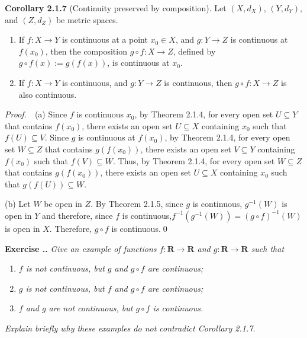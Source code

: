 \documentclass{book}
\newcommand{\pff}{\vspace{.25em}\noindent\emph{Proof.}~~}
\newcommand{\titl}[1]{\noindent\textbf{#1}}
\newcounter{Exercise}[section]
\renewcommand{\theExercise}{\thesection.\arabic{Exercise}.}
\newcommand{\new}{\vspace{1.5em}\noindent\textbf{Exercise \stepcounter{Exercise}\textbf{\theExercise}} }
\begin{document}
\begin{framed}
\titl{Corollary 2.1.7} (Continuity preserved by composition). Let $(X,d_X)$, $(Y,d_Y)$, and $(Z,d_Z)$ be metric spaces.
\begin{enumerate}
    \item If $f:X\to Y$ is continuous at a point $x_0\in X$, and $g:Y\to Z$ is continuous at $f(x_0)$, then the composition $g\circ f:X\to Z$, defined by $g\circ f(x):=g(f(x))$, is continuous at $x_0$.
    \item If $f:X\to Y$ is continuous, and $g:Y\to Z$ is continuous, then $g\circ f:X\to Z$ is also continuous.
\end{enumerate}
\end{framed}

\pff (a) Since $f$ is continuous $x_0$, by Theorem 2.1.4, for every open set $U\subseteq Y$ that contains $f(x_0)$, there exists an open set $U\subseteq X$ containing $x_0$ such that $f(U)\subseteq V$. Since $g$ is continuous at $f(x_0)$, by Theorem 2.1.4, for every open set $W\subseteq Z$ that contains $g(f(x_0))$, there exists an open set $V\subseteq Y$ containing $f(x_0)$ such that $f(V)\subseteq W$. Thus, by Theorem 2.1.4, for every open set $W\subseteq Z$ that contains $g(f(x_0))$, there exists an open set $U\subseteq X$ containing $x_0$ such that $g(f(U))\subseteq W$.

(b) Let $W$ be open in $Z$. By Theorem 2.1.5, since $g$ is continuous, $g^{-1}(W)$ is open in $Y$ and therefore, since $f$ is continuous,$f^{-1}(g^{-1}(W))=(g\circ f)^{-1}(W)$ is open in $X$. Therefore, $g\circ f$ is continuous.\qed

\new\emph{Give an example of functions $f:\mathbf{R}\to\mathbf{R}$ and $g:\mathbf{R}\to\mathbf{R}$ such that}
\begin{enumerate}
    \item \emph{$f$ is not continuous, but $g$ and $g\circ f$ are continuous;}
    \item \emph{$g$ is not continuous, but $f$ and $g\circ f$ are continuous;}
    \item \emph{$f$ and $g$ are not continuous, but $g\circ f$ is continuous.}
\end{enumerate}
\emph{Explain briefly why these examples do not contradict Corollary 2.1.7.}
\end{document}
